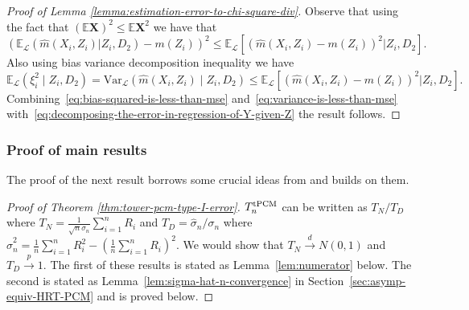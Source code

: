\documentclass[12pt]{article}
\theoremstyle{definition}
\theoremstyle{remark}
\newcommand{\E}{\mathbb E}								%
\newcommand{\prx}{\bm X}								%
\newcommand{\srx}{X}									%
\newcommand{\srz}{Z}									%
\newcommand{\law}{\mathcal L}							%
\begin{document}
\begin{proof}[Proof of Lemma \ref{lemma:estimation-error-to-chi-square-div}]
	Observe that using the fact that $(\E \prx)^2 \leq \E \prx^2$ 	we have that
	\begin{equation}\label{eq:bias-squared-is-less-than-mse}
		(\E_{\law} (\widehat m(\srx_i,\srz_i) |\srz_i,D_2) - m(\srz_i) )^2 \leq  \E_\law[ (\widehat m (\srx_i,\srz_i) - m(\srz_i))^2|\srz_i, D_2].
	\end{equation} 
	Also using bias variance decomposition inequality we have 
	\begin{equation}\label{eq:variance-is-less-than-mse}
		\E_\law (\xi_i^2\mid \srz_i,D_2) = \mathrm{Var}_{\law}(\widehat m(\srx_i, \srz_i)\mid \srz_i, D_2)  \leq \E_\law[ (\widehat m (\srx_i,\srz_i) - m(\srz_i))^2|\srz_i, D_2].
	\end{equation}
	Combining~\eqref{eq:bias-squared-is-less-than-mse} and~\eqref{eq:variance-is-less-than-mse} with~\eqref{eq:decomposing-the-error-in-regression-of-Y-given-\srz} the result follows.
\end{proof}
\subsubsection{Proof of main results} \label{sec:proofs-of-main-results-sec-3}
The proof of the next result borrows some crucial ideas from \citet{Lundborg2022a} and builds on them.
\begin{proof}[Proof of Theorem \ref{thm:tower-pcm-type-I-error}]
	$T_n^{\textnormal{tPCM}}$ can be written as $T_N/T_D$ where $T_N = \frac{1}{\sqrt n \sigma_n} \sum_{i=1}^n R_i$ and $T_D = \widehat \sigma_n/\sigma_n$ where $\widehat \sigma_n^2 = \frac{1}{n}\sum_{i=1}^n R_i^2 - \left(\frac{1}{n} \sum_{i=1}^n R_i\right)^2$.
	We would show that $T_N \overset{d}{\to} N(0,1)$ and $T_D \overset{p}{\to} 1$. The first of these results is stated as Lemma~\ref{lem:numerator} below. The second is stated as Lemma~\ref{lem:sigma-hat-n-convergence} in Section~\ref{sec:asymp-equiv-HRT-PCM} and is proved below.
\end{proof}
\end{document}
